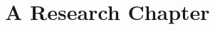 \documentclass[12pt,openright,oneside,a4paper,brazil,main=english,sumario=tradicional]{gpsabntex}
\numberwithin{listing}{chapter}
\begin{document}
\tableofcontents*
\thispagestyle{empty}

\mainmatter
\cleardoublepage
\pagestyle{plain} %
\renewcommand{\thepage}{\arabic{page}}  %


\chapter[Paper]{A Research Chapter}
\label{sec:org12f8bed}
\end{document}
